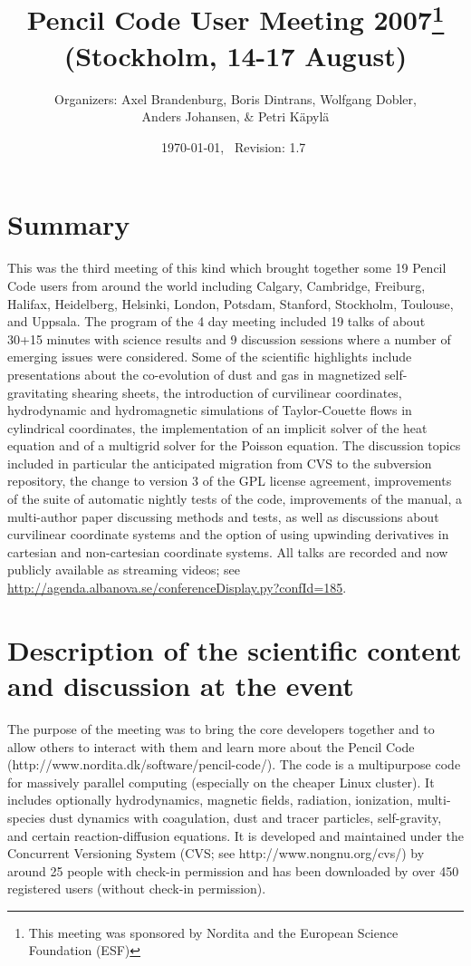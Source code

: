 \documentclass{article}
\title{Pencil Code User Meeting 2007\footnote{This meeting
was sponsored by Nordita and the European Science Foundation (ESF)}\\
(Stockholm, 14-17 August)}
\author{Organizers: Axel Brandenburg, Boris Dintrans, Wolfgang Dobler,\\
Anders Johansen, \& Petri K\"apyl\"a}
\date{\today,~ $ $Revision: 1.7 $ $}
\begin{document}
\maketitle

\section{Summary} %

This was the third meeting of this kind which brought together
some 19 Pencil Code users from around the world including
Calgary, Cambridge, Freiburg, Halifax, Heidelberg, Helsinki,
London, Potsdam, Stanford, Stockholm, Toulouse, and Uppsala.
The program of the 4 day meeting included 19 talks of about
30+15 minutes with science results and 9 discussion sessions
where a number of emerging issues were considered.
Some of the scientific highlights include presentations about
the co-evolution of dust and gas in magnetized self-gravitating
shearing sheets, the introduction of curvilinear coordinates,
hydrodynamic and hydromagnetic simulations of
Taylor-Couette flows in cylindrical coordinates,
the implementation of an implicit solver of the heat equation and
of a multigrid solver for the Poisson equation.
The discussion topics included in particular
the anticipated migration from CVS to the subversion repository,
the change to version 3 of the GPL license agreement,
improvements of the suite of automatic nightly tests of the code,
improvements of the manual,
a multi-author paper discussing methods and tests,
as well as discussions about curvilinear coordinate systems
and the option of using upwinding derivatives in
cartesian and non-cartesian coordinate systems.
All talks are recorded and now publicly available as streaming videos; see
\url{http://agenda.albanova.se/conferenceDisplay.py?confId=185}.

\section{Description of the scientific content and discussion at the event}

The purpose of the meeting was to bring the core developers together and
to allow others to interact with them and learn more about the Pencil Code
(http://www.nordita.dk/software/pencil-code/). The code is a multipurpose
code for massively parallel computing (especially on the cheaper
Linux cluster). It includes optionally hydrodynamics, magnetic fields,
radiation, ionization, multi-species dust dynamics with coagulation, dust and
tracer particles, self-gravity, and
certain reaction-diffusion equations. It is developed and maintained under
the Concurrent Versioning System (CVS; see http://www.nongnu.org/cvs/)
by around 25 people with check-in permission and has been downloaded by
over 450 registered users (without check-in permission).
\end{document}
